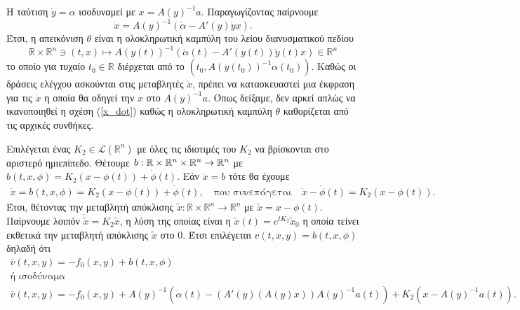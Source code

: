 Η ταύτιση $\dot{y} = \alpha$ ισοδυναμεί με $x = A(y)^{-1}a$. Παραγωγίζοντας 
παίρνουμε 
\begin{equation}
    \dot{x} = A(y)^{-1}\left(\dot{\alpha} - A'(y)\dot{y}x\right).
\label{x_dot}
\end{equation} 
Έτσι, η απεικόνιση $\theta$ είναι η ολοκληρωτική καμπύλη του λείου διανυσματικού 
πεδίου 
\begin{equation*}
    \mathbb{R} \times \mathbb{R}^n \ni(t,x) \mapsto A\left(y(t)\right)^{-1}
    \left(\dot{\alpha}(t) - A'\left(y(t)\right)\dot{y}(t)x\right) \in 
    \mathbb{R}^n
\end{equation*}
το οποίο για τυχαίο $t_0 \in \mathbb{R}$ διέρχεται από το $(t_0,A
\left(y(t_0)\right)^{-1}\alpha(t_0))$. Καθώς οι δράσεις ελέγχου ασκούνται στις
μεταβλητές $\dot x$, πρέπει να κατασκευαστεί μια έκφραση για τις $\dot x$ η 
οποία θα οδηγεί την $x$ στο $A(y)^{-1}a$. Όπως δείξαμε, δεν αρκεί απλώς να 
ικανοποιηθεί η σχέση (\ref{x_dot}) καθώς η ολοκληρωτική καμπύλη $\theta$ 
καθορίζεται από τις αρχικές συνθήκες.

Επιλέγεται ένας $K_2 \in \mathcal{L}(\mathbb{R}^n)$ με όλες τις ιδιοτιμές 
του $K_2$ να βρίσκονται στο αριστερό ημιεπίπεδο. Θέτουμε $b:\mathbb{R}\times
\mathbb{R}^n\times\mathbb{R}^n \rightarrow \mathbb{R}^n$ με $b(t,x,\phi) = K_2(x - 
\phi(t))+\dot{\phi}(t)$. Εάν $\dot{x} = b$ τότε θα έχουμε
\begin{gather*}
    \dot{x} = b(t,x,\phi) = K_2(x - \phi(t))+\dot{\phi}(t), \quad
    \text{που συνεπάγεται}\quad \dot{x} - \dot{\phi}(t) = K_2(x - \phi(t)).
\end{gather*}
Έτσι, θέτοντας την μεταβλητή απόκλισης $\widetilde{x}:\mathbb{R}\times 
\mathbb{R}^n \rightarrow \mathbb{R}^n$ με $\widetilde{x} = x - \phi(t)$. 
Παίρνουμε λοιπόν $\dot{\widetilde{x}} = K_2 \widetilde{x}$, η λύση της οποίας 
είναι η $\widetilde{x}(t) = e^{tK_2} \widetilde{x}_0$ η οποία τείνει εκθετικά 
την μεταβλητή απόκλισης $ \widetilde{x}$ στο 0. Έτσι επιλέγεται $v(t,x,y) = 
b(t,x,\phi)$ δηλαδή ότι
\begin{equation}
    \begin{gathered}
        \overline{v}(t,x,y) = -f_0(x,y) + b(t,x,\phi) \\
        \text{ή ισοδύναμα} \\
        \overline{v}(t,x,y) = -f_0(x,y) + A(y)^{-1}(\dot{\alpha}(t) - 
        (A'(y)(A(y)x))A(y)^{-1}a(t)) + K_2(x - A(y)^{-1}a(t)).
    \end{gathered} \label{ctl:ctl}
\end{equation}

